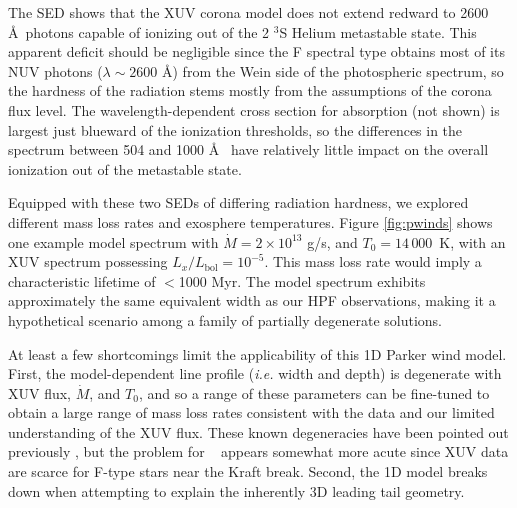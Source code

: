\documentclass[linenumbers, twocolumn, trackchanges]{aastex631}
\newcommand{\hatpb}{\object{HAT-P-67 b}}
\begin{document}
The SED shows that the XUV corona model does not extend redward to 2600 \AA~photons capable of ionizing out of the 2 $^3$S Helium metastable state.  This apparent deficit should be negligible since the F spectral type obtains most of its NUV photons ($\lambda\sim2600$ \AA) from the Wein side of the photospheric spectrum, so the hardness of the radiation stems mostly from the assumptions of the corona flux level.  The wavelength-dependent cross section for absorption (not shown) is largest just blueward of the ionization thresholds, so the differences in the spectrum between 504 and 1000 \AA~ have relatively little impact on the overall ionization out of the metastable state.

Equipped with these two SEDs of differing radiation hardness, we explored different mass loss rates and exosphere temperatures.  Figure \ref{fig:pwinds} shows one example model spectrum with $\dot{M} = 2\times 10^{13}$ g/s, and $T_0=14\,000$~K, with an XUV spectrum possessing $L_x/L_\mathrm{bol}=10^{-5}$.  This mass loss rate would imply a characteristic lifetime of $<$1000 Myr.  The model spectrum exhibits approximately the same equivalent width as our HPF observations, making it a hypothetical scenario among a family of partially degenerate solutions.

At least a few shortcomings limit the applicability of this 1D Parker wind model.  First, the model-dependent line profile (\emph{i.e.} width and depth) is degenerate with XUV flux, $\dot{M}$, and $T_0$, and so a range of these parameters can be fine-tuned to obtain a large range of mass loss rates consistent with the data and our limited understanding of the XUV flux.  These known degeneracies have been pointed out previously \citep{2022AJ....164..234V,2019ApJ...881..133O}, but the problem for \hatpb~ appears somewhat more acute since XUV data are scarce for F-type stars near the Kraft break.  Second, the 1D model breaks down when attempting to explain the inherently 3D leading tail geometry.
\end{document}
